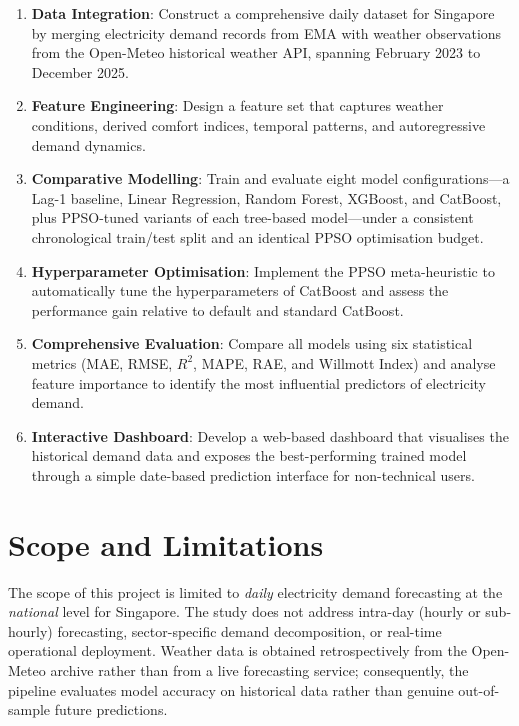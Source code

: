\begin{enumerate}
    \item \textbf{Data Integration}: Construct a comprehensive daily dataset for Singapore by merging electricity demand records from EMA with weather observations from the Open-Meteo historical weather API, spanning February 2023 to December 2025.
    \item \textbf{Feature Engineering}: Design a feature set that captures weather conditions, derived comfort indices, temporal patterns, and autoregressive demand dynamics.
    \item \textbf{Comparative Modelling}: Train and evaluate eight model configurations---a Lag-1 baseline, Linear Regression, Random Forest, XGBoost, and CatBoost, plus PPSO-tuned variants of each tree-based model---under a consistent chronological train/test split and an identical PPSO optimisation budget.
    \item \textbf{Hyperparameter Optimisation}: Implement the PPSO meta-heuristic to automatically tune the hyperparameters of CatBoost and assess the performance gain relative to default and standard CatBoost.
    \item \textbf{Comprehensive Evaluation}: Compare all models using six statistical metrics (MAE, RMSE, $R^2$, MAPE, RAE, and Willmott Index) and analyse feature importance to identify the most influential predictors of electricity demand.
    \item \textbf{Interactive Dashboard}: Develop a web-based dashboard that visualises the historical demand data and exposes the best-performing trained model through a simple date-based prediction interface for non-technical users.
\end{enumerate}


\section{Scope and Limitations}

The scope of this project is limited to \emph{daily} electricity demand forecasting at the \emph{national} level for Singapore. The study does not address intra-day (hourly or sub-hourly) forecasting, sector-specific demand decomposition, or real-time operational deployment. Weather data is obtained retrospectively from the Open-Meteo archive rather than from a live forecasting service; consequently, the pipeline evaluates model accuracy on historical data rather than genuine out-of-sample future predictions.

